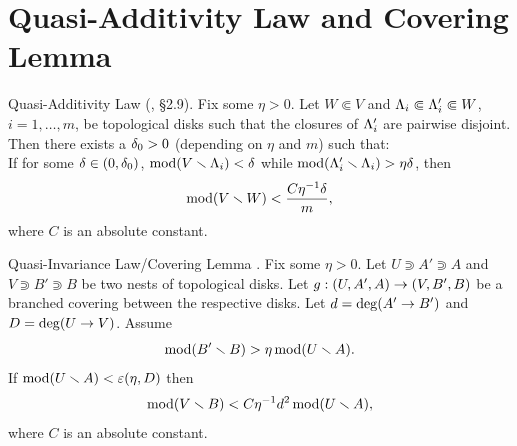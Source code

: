 
\section{Quasi-Additivity Law and Covering Lemma}\label{covering lemma sec} 




\proclaim Quasi-Additivity Law (\cite{covering lemma}, {\rm \S 2.9}). 
    Fix some $\eta>0$. 
Let $W\Subset V$ and  ${\Lambda}_i\Subset {\Lambda}_i'\Subset W $, $i=1,\dots, m$, 
be topological disks such that the closures of ${\Lambda}_i'$ are pairwise disjoint. 
Then there exists a ${\delta}_0 > 0$ (depending on $\eta$ and $m$) such that: \\
If  for some ${\delta}\in (0, {\delta}_0)$,
$\operatorname{mod} (V\smallsetminus {\Lambda}_i) < {\delta}$ while $\operatorname{mod}({\Lambda}_i'\smallsetminus {\Lambda}_i) > \eta{\delta}$, then
$$
  \operatorname{mod}(V\smallsetminus W) < \frac{C \eta^{-1} {\delta}}{m},
$$
where $C$ is an absolute constant.


\proclaim Quasi-Invariance Law/Covering Lemma \cite{covering lemma}. 
Fix some  $\eta>0$. 
 Let $U\Supset A'\Supset A$ and $V\Supset B' \Supset B$ be two nests of topological disks.
Let $g: (U, A', A) \rightarrow (V, B', B)$ be a branched covering between the respective disks.
Let $d = \deg(A'\rightarrow B')$ and  $D = \deg(U\rightarrow V)$.
Assume  
$$
   \operatorname{mod}(B'\smallsetminus B) > \eta \operatorname{mod}(U\smallsetminus A).
$$
If $\operatorname{mod}(U\smallsetminus A) < {\varepsilon}(\eta, D) $ then 
$$
      \operatorname{mod} (V\smallsetminus B)  <  C\eta^{-1} d^2 \operatorname{mod}(U\smallsetminus A),
$$
where $C$ is an absolute constant.





